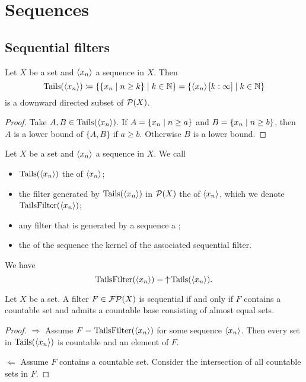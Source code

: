 \section{Sequences}
\subsection{Sequential filters}

\begin{lemma}
Let $X$ be a set and $\left\langle x_n \right\rangle$ a sequence in $X$. Then
\[ \operatorname{Tails}(\left\langle x_n \right\rangle) \coloneqq \left\{ \left\{ x_n \;\middle|\; n \geq k \right\} \;\middle|\; k\in \mathbb{N} \right\} = \left\{ \left\langle x_n \right\rangle[k:\infty] \;\middle|\; k\in \mathbb{N} \right\} \]
is a downward directed subset of $\operatorname{\mathcal{P}}(X)$.
\end{lemma}
\begin{proof}
Take $A,B\in \operatorname{Tails}(\left\langle x_n \right\rangle)$. If $A = \left\{ x_n \;\middle|\; n \geq a \right\}$ and $B = \left\{ x_n \;\middle|\; n \geq b \right\}$, then $A$ is a lower bound of $\{A,B\}$ if $a\geq b$. Otherwise $B$ is a lower bound.
\end{proof}

\begin{definition}
Let $X$ be a set and $\left\langle x_n \right\rangle$ a sequence in $X$. We call
\begin{itemize}
\item $\operatorname{Tails}(\left\langle x_n \right\rangle)$ the  of $\left\langle x_n \right\rangle$;
\item the filter generated by $\operatorname{Tails}(\left\langle x_n \right\rangle)$ in $\operatorname{\mathcal{P}}(X)$ the  of $\left\langle x_n \right\rangle$, which we denote $\operatorname{TailsFilter}(\left\langle x_n \right\rangle)$;
\item any filter that is generated by a sequence a ;
\item the  of the sequence the kernel of the associated sequential filter.
\end{itemize}
We have 
\[ \operatorname{TailsFilter}(\left\langle x_n \right\rangle) = \operatorname{\uparrow} \operatorname{Tails}(\left\langle x_n \right\rangle). \]
\end{definition}

\begin{proposition}
Let $X$ be a set. A filter $F\in \operatorname{\mathcal{FP}}(X)$ is sequential \textup{if and only if} $F$ contains a countable set and admits a countable base consisting of almost equal sets.
\end{proposition}
\begin{proof}
$\Rightarrow$ Assume $F = \operatorname{TailsFilter}(\left\langle x_n \right\rangle)$ for some sequence $\left\langle x_n \right\rangle$. Then every set in $\operatorname{Tails}(\left\langle x_n \right\rangle)$ is countable and an element of $F$.

$\Leftarrow$ Assume $F$ contains a countable set. Consider the intersection of all countable sets in $F$.
\end{proof}

